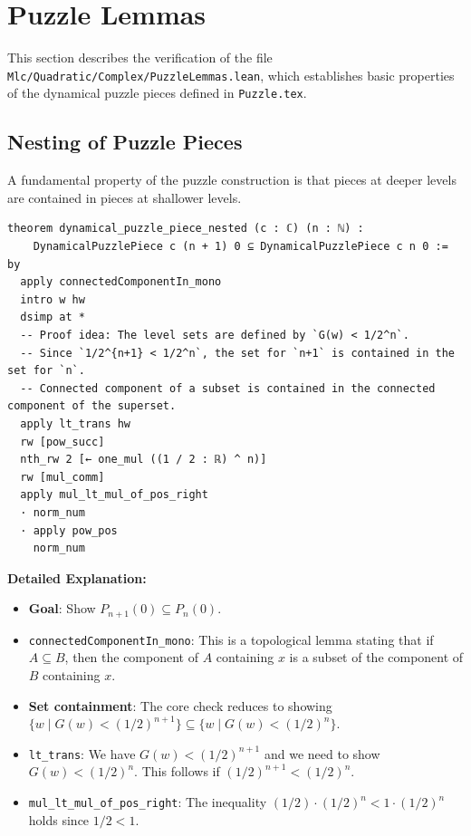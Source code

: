 \section{Puzzle Lemmas}
\label{sec:PuzzleLemmas}

This section describes the verification of the file \texttt{Mlc/Quadratic/Complex/PuzzleLemmas.lean}, which establishes basic properties of the dynamical puzzle pieces defined in \texttt{Puzzle.tex}.

\subsection{Nesting of Puzzle Pieces}

A fundamental property of the puzzle construction is that pieces at deeper levels are contained in pieces at shallower levels.

\begin{lstlisting}[language=Lean]
theorem dynamical_puzzle_piece_nested (c : ℂ) (n : ℕ) :
    DynamicalPuzzlePiece c (n + 1) 0 ⊆ DynamicalPuzzlePiece c n 0 := by
  apply connectedComponentIn_mono
  intro w hw
  dsimp at *
  -- Proof idea: The level sets are defined by `G(w) < 1/2^n`.
  -- Since `1/2^{n+1} < 1/2^n`, the set for `n+1` is contained in the set for `n`.
  -- Connected component of a subset is contained in the connected component of the superset.
  apply lt_trans hw
  rw [pow_succ]
  nth_rw 2 [← one_mul ((1 / 2 : ℝ) ^ n)]
  rw [mul_comm]
  apply mul_lt_mul_of_pos_right
  · norm_num
  · apply pow_pos
    norm_num
\end{lstlisting}

\noindent
\textbf{Detailed Explanation:}
\begin{itemize}
    \item \textbf{Goal}: Show $P_{n+1}(0) \subseteq P_n(0)$.
    \item \texttt{connectedComponentIn\_mono}: This is a topological lemma stating that if $A \subseteq B$, then the component of $A$ containing $x$ is a subset of the component of $B$ containing $x$.
    \item \textbf{Set containment}: The core check reduces to showing $\{w \mid G(w) < (1/2)^{n+1}\} \subseteq \{w \mid G(w) < (1/2)^n\}$.
    \item \texttt{lt\_trans}: We have $G(w) < (1/2)^{n+1}$ and we need to show $G(w) < (1/2)^n$. This follows if $(1/2)^{n+1} < (1/2)^n$.
    \item \texttt{mul\_lt\_mul\_of\_pos\_right}: The inequality $(1/2) \cdot (1/2)^n < 1 \cdot (1/2)^n$ holds since $1/2 < 1$.
\end{itemize}

